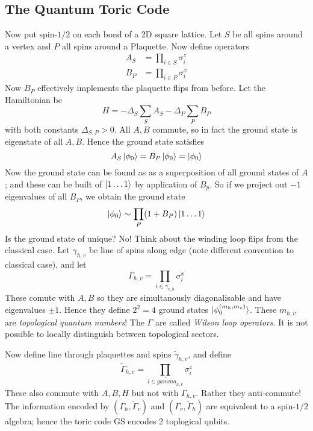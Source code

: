 \documentclass[a4paper]{article}
\begin{document}
\subsection{The Quantum Toric Code}
Now put spin-$1/2$ on each bond of a 2D square lattice. Let $S$ be all spins
around a vertex and $P$ all spins around a Plaquette. Now define operators
\begin{align*}
    A_S&=\prod_{i\in S} \sigma_{i}^z\\
    B_P&=\prod_{i\in P} \sigma_i^x
\end{align*}
Now $B_P$ effectively implements the plaquette flips from before. Let the
Hamiltonian be
\[
    H=-\Delta_S\sum_S A_S - \Delta_P\sum_P B_P
\]
with both constants $\Delta_{S,P}>0$. All $A,B$ commute, so in fact the ground
state is eigenstate of all $A,B$. Hence the ground state satisfies
\[
    A_S\ket{\phi_0}=B_P\ket{\phi_0}=\ket{\phi_0}
\]
Now the ground state can be found as as a superposition of all ground states of
$A$; and these can be built of $\ket{1\dots1}$ by application of $B_p$. So if we
project out $-1$ eigenvalues of all $B_P$, we obtain the ground state
\[
    \ket{\phi_0} \sim \prod_P (1+B_P)\ket{1\dots1}
\]
Is the ground state of unique? No!
Think about the winding loop flips from the classical case. Let $\gamma_{h,v}$
be line of spins along edge (note different convention to classical case), and
let
\[ \Gamma_{h,v}=\prod_{i\in \gamma_{v,h}}\sigma_i^x\]
These comute with $A,B$ so they are simultanously diagonalisable and have
eigenvalues $\pm 1$. Hence they define $2^2=4$ ground states
$\ket{\phi_0^{(m_h,m_v)}}$. These $m_{h,v}$ are \emph{topological quantum
numbers}! The $\Gamma$ are called \emph{Wilson loop operators}. It is not
possible to locally distinguish between topological sectors.

Now define line through plaquettes and spins $\tilde{\gamma}_{h,v}$, and define 
\[\tilde{\Gamma}_{h,v}=\prod_{i\in \tilde{gamma}_{h,v}}\sigma_i^z\]
These also commute with $A,B,H$ but not with $\Gamma_{h,v}$. Rather they
anti-commute! The information
encoded by
$(\Gamma_h,\tilde{\Gamma}_v)$ and $(\Gamma_{v},\tilde{\Gamma}_h)$ are equivalent
to a spin-$1/2$ algebra; hence the toric code GS encodes 2 toplogical qubits.
\end{document}
